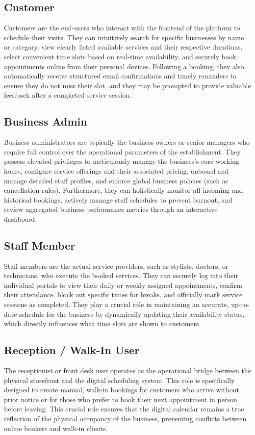 \subsection{Customer}
Customers are the end-users who interact with the frontend of the platform to schedule their visits. They can intuitively search for specific businesses by name or category, view clearly listed available services and their respective durations, select convenient time slots based on real-time availability, and securely book appointments online from their personal devices. Following a booking, they also automatically receive structured email confirmations and timely reminders to ensure they do not miss their slot, and they may be prompted to provide valuable feedback after a completed service session.

\subsection{Business Admin}
Business administrators are typically the business owners or senior managers who require full control over the operational parameters of the establishment. They possess elevated privileges to meticulously manage the business's core working hours, configure service offerings and their associated pricing, onboard and manage detailed staff profiles, and enforce global business policies (such as cancellation rules). Furthermore, they can holistically monitor all incoming and historical bookings, actively manage staff schedules to prevent burnout, and review aggregated business performance metrics through an interactive dashboard.

\subsection{Staff Member}
Staff members are the actual service providers, such as stylists, doctors, or technicians, who execute the booked services. They can securely log into their individual portals to view their daily or weekly assigned appointments, confirm their attendance, block out specific times for breaks, and officially mark service sessions as completed. They play a crucial role in maintaining an accurate, up-to-date schedule for the business by dynamically updating their availability status, which directly influences what time slots are shown to customers.

\subsection{Reception / Walk-In User}
The receptionist or front desk user operates as the operational bridge between the physical storefront and the digital scheduling system. This role is specifically designed to create manual, walk-in bookings for customers who arrive without prior notice or for those who prefer to book their next appointment in person before leaving. This crucial role ensures that the digital calendar remains a true reflection of the physical occupancy of the business, preventing conflicts between online bookers and walk-in clients.

